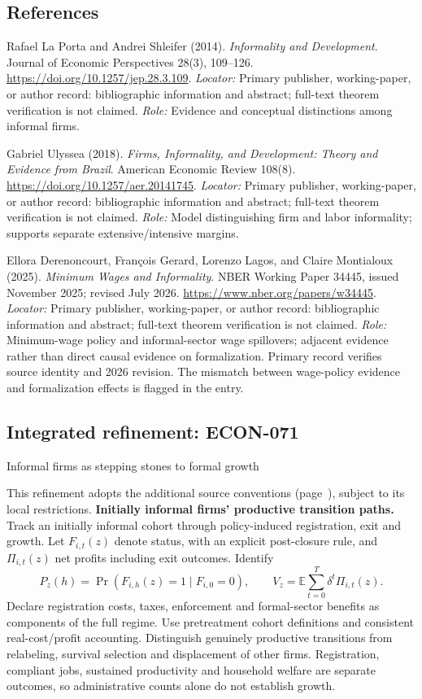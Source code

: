 \documentclass[11pt,a4paper]{article}
\begin{document}
\subsection*{References}
\begin{enumerate}[label=\textnormal{[S\arabic*]},leftmargin=*]
\item Rafael La Porta and Andrei Shleifer (2014). \emph{Informality and Development}. Journal of Economic Perspectives 28(3), 109--126. \url{https://doi.org/10.1257/jep.28.3.109}. \textit{Locator:} Primary publisher, working-paper, or author record: bibliographic information and abstract; full-text theorem verification is not claimed. \textit{Role:} Evidence and conceptual distinctions among informal firms.
\item Gabriel Ulyssea (2018). \emph{Firms, Informality, and Development: Theory and Evidence from Brazil}. American Economic Review 108(8). \url{https://doi.org/10.1257/aer.20141745}. \textit{Locator:} Primary publisher, working-paper, or author record: bibliographic information and abstract; full-text theorem verification is not claimed. \textit{Role:} Model distinguishing firm and labor informality; supports separate extensive/intensive margins.
\item Ellora Derenoncourt, François Gerard, Lorenzo Lagos, and Claire Montialoux (2025). \emph{Minimum Wages and Informality}. NBER Working Paper 34445, issued November 2025; revised July 2026. \url{https://www.nber.org/papers/w34445}. \textit{Locator:} Primary publisher, working-paper, or author record: bibliographic information and abstract; full-text theorem verification is not claimed. \textit{Role:} Minimum-wage policy and informal-sector wage spillovers; adjacent evidence rather than direct causal evidence on formalization. Primary record verifies source identity and 2026 revision. The mismatch between wage-policy evidence and formalization effects is flagged in the entry.
\end{enumerate}

\subsection*{Integrated refinement: ECON-071}
{\sffamily\small\color{muted}Informal firms as stepping stones to formal growth\par}
This refinement adopts the additional source conventions
(page~\pageref{audited:conventions}), subject to its local restrictions.
\textbf{Initially informal firms' productive transition paths.}
Track an initially informal cohort through policy-induced registration, exit
and growth. Let $F_{i,t}(z)$ denote status, with an explicit post-closure rule,
and $\Pi_{i,t}(z)$ net profits including exit outcomes. Identify
\[
P_z(h)=\Pr(F_{i,h}(z)=1\mid F_{i,0}=0),\qquad
V_z=\mathbb E\sum_{t=0}^{T}\delta^t\Pi_{i,t}(z).
\]
Declare registration costs, taxes, enforcement and formal-sector benefits as
components of the full regime. Use pretreatment cohort definitions and
consistent real-cost/profit accounting. Distinguish genuinely productive
transitions from relabeling, survival selection and displacement of other firms.
Registration, compliant jobs, sustained productivity and household welfare are
separate outcomes, so administrative counts alone do not establish growth.
\end{document}
